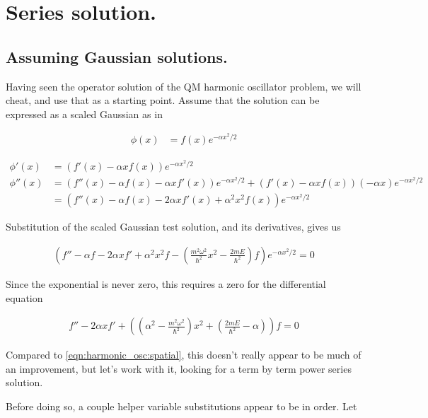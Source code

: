\section{Series solution. }

\subsection{Assuming Gaussian solutions. }

Having seen the operator solution of the QM harmonic oscillator problem, we will cheat, and use that as a starting point.  Assume that
the solution can be expressed as a scaled Gaussian as in

\begin{align}
\phi(x) &= f(x) e^{ - \alpha x^2/2 }
\end{align}

\begin{align*}
\phi'(x) &= \left( f'(x) - \alpha x f(x) \right) e^{ - \alpha x^2/2 } \\
\phi''(x)
&=
\left( f''(x) - \alpha f(x) -\alpha x f'(x) \right) e^{ - \alpha x^2/2 }
+\left( f'(x) - \alpha x f(x) \right) (-\alpha x) e^{ - \alpha x^2/2 } \\
&=
\left( f''(x) - \alpha f(x) - 2 \alpha x f'(x) + \alpha^2 x^2 f(x) \right) e^{ - \alpha x^2/2 }
\end{align*}

Substitution of the scaled Gaussian test solution, and its derivatives, gives us

\begin{align*}
\left( f'' - \alpha f - 2 \alpha x f' + \alpha^2 x^2 f - \left( \frac{m^2 \omega^2}{\hbar^2} x^2 - \frac{2 m E}{\hbar^2} \right) f \right) e^{ -\alpha x^2 /2} = 0
\end{align*}

Since the exponential is never zero, this requires a zero for the differential equation

\begin{align}
f'' - 2 \alpha x f' + \left( \left(\alpha^2 - \frac{m^2 \omega^2}{\hbar^2} \right) x^2 + \left(\frac{2 m E}{\hbar^2} - \alpha \right) \right) f = 0
\end{align}

Compared to \ref{eqn:harmonic_osc:spatial}, this doesn't really appear to be much of an improvement, but let's work with it, looking for a term by term power series solution.

Before doing so, a couple helper variable substitutions appear to be in order.  Let

